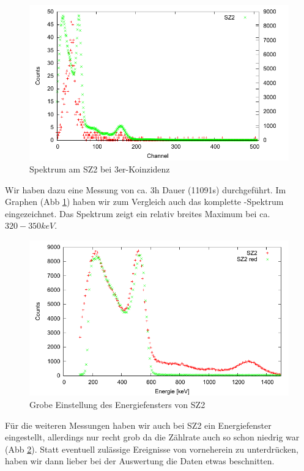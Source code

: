 \begin{figure}
 \includegraphics[width=\textwidth]{Graphen/3er/spektrum-2.pdf}
 \caption{Spektrum am SZ2 bei 3er-Koinzidenz}
 \label{graphen-3er-spektrum-2}
\end{figure}

Wir haben dazu eine Messung von ca. 3h Dauer (11091s) durchgeführt. Im Graphen (Abb \ref{graphen-3er-spektrum-2}) haben wir zum Vergleich auch das komplette \Na-Spektrum eingezeichnet. Das Spektrum zeigt ein relativ breites Maximum bei ca. $320-350 keV$.


\begin{figure}
\includegraphics[width=\textwidth]{Graphen/3er/red-spektrum-sz2.pdf}
 \caption{Grobe Einstellung des Energiefensters von SZ2}
\label{graphen-3er-red-spektrum-sz2}
\end{figure}

Für die weiteren Messungen haben wir auch bei SZ2 ein Energiefenster eingestellt, allerdings nur recht grob da die Zählrate auch so schon niedrig war (Abb \ref{graphen-3er-red-spektrum-sz2}). Statt eventuell zulässige Ereignisse von vorneherein zu unterdrücken, haben wir dann lieber bei der Auswertung die Daten etwas beschnitten.

